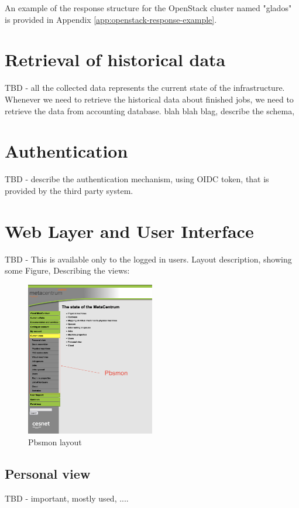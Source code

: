 \documentclass[
  digital,     %
  oneside,     %
  nosansbold,  %
  nocolorbold, %
  lof,         %
  lot,         %
]{fithesis4}
\begin{document}
An example of the response structure for the OpenStack cluster named "glados" is provided in Appendix \ref{app:openstack-response-example}.


\newpage
\section{Retrieval of historical data}
\label{sec:collection-of-historical-data}
TBD - all the collected data represents the current state of the infrastructure.
Whenever we need to retrieve the historical data about finished jobs, we need to retrieve the data from accounting database. blah blah blag, describe the schema, 

\section{Authentication}
\label{sec:authentication}
TBD - describe the authentication mechanism, using OIDC token, that is provided by the third party system.

\section{Web Layer and User Interface}
TBD - This is available only to the logged in users.
Layout description, showing some Figure, Describing the views:

\begin{figure}[h]
  \centering
  \includegraphics[width=0.5\textwidth]{figures/pbsmon.png}
  \caption{Pbsmon layout}
  \label{fig:pbsmon}
\end{figure}

\newpage
\subsection{Personal view}
\label{subsec:personal-view}
TBD - important, mostly used, ....
\end{document}
